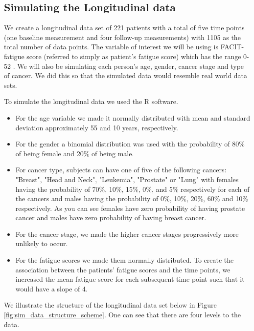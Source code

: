 \documentclass[fleqn,10pt]{wlscirep}\usepackage[]{graphicx}\usepackage[]{color}
\begin{document}
\subsection{Simulating the Longitudinal data}

We create a longitudinal data set of 221 patients with a total of five time points (one baseline measurement and four follow-up measurements) with 1105 as the total number of data points. The variable of interest we will be using is FACIT-fatigue score (referred to simply as patient's fatigue score) which has the range 0-52 \cite{acaster2015qualitative}. We will also be simulating each person's age, gender, cancer stage and type of cancer. We did this so that the simulated data would resemble real world data sets. %

To simulate the longitudinal data we used the R software. 

\begin{itemize}

\item For the age variable we made it normally distributed with mean and standard deviation approximately 55 and 10 years, respectively. 
\item For the gender a binomial distribution was used with the probability of 80\% of being female and 20\% of being male. 
\item For cancer type, subjects can have one of five of the following cancers: "Breast", "Head and Neck", "Leukemia", "Prostate" or "Lung"  with females having the probability of 70\%, 10\%, 15\%, 0\%, and 5\% respectively for each of the cancers and males having the probability of 0\%, 10\%, 20\%, 60\% and 10\% respectively. As you can see females have zero probability of having prostate cancer and males have zero probability of having breast cancer. 
\item For the cancer stage, we made the higher cancer stages progressively more unlikely to occur. %
\item For the fatigue scores we made them normally distributed. To create the association between the patients' fatigue scores and the time points, we increased the mean fatigue score for each subsequent time point such that it would have a slope of 4. 

\end{itemize}

We illustrate the structure of the longitudinal data set below in Figure \ref{fig:sim_data_structure_scheme}. One can see that there are four levels to the data. 
\end{document}
